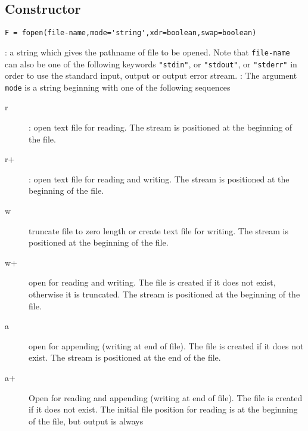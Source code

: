 
\begin{mandesc}
\end{mandesc}

\subsection*{Constructor}
\label{fopen}
\begin{verbatim}
F = fopen(file-name,mode='string',xdr=boolean,swap=boolean)
\end{verbatim}
\begin{parameters}
  \begin{varlist}
    : a string which gives the pathname of file to be opened. 
    Note that \verb+file-name+ can also be one of the following keywords \verb+"stdin"+, or 
    \verb+"stdout"+, or \verb+"stderr"+ in order to use the standard input, output or output error 
    stream.
    : The argument \verb+mode+ is a string beginning  with  one  of  the  following  sequences
    \begin{description}
      \item[r]: open text file for reading. The stream is positioned at the beginning of the
        file. 
      \item[r+]: open text file for reading and writing. The stream is positioned at the beginning of the
        file. 
      \item[w] truncate  file  to  zero  length  or create text file for writing.  The stream is
        positioned at the beginning of the file.
      \item[w+] open for reading and writing.  The file is created if it  does  not
        exist,  otherwise it is truncated.  The stream is positioned at the beginning of the file.
      \item[a] open for appending (writing at end of file).  The file is created if it does not 
	exist.  The stream is positioned at the end of the file.
      \item[a+]  Open for reading and appending (writing at end of file).  The  file
        is  created  if  it  does not exist.  The initial file position for
        reading is at the beginning of  the  file,  but  output  is  always

\end{description}
\end{varlist}
\end{parameters}

